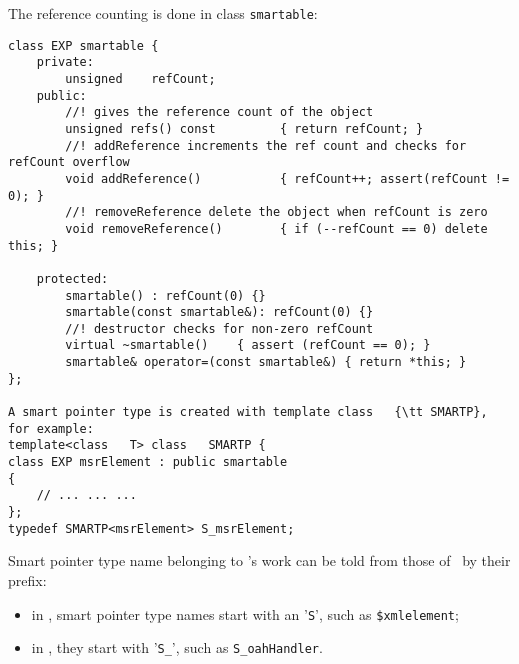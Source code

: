 The reference counting is done in class   {\tt smartable}:
\begin{lstlisting}[language=CPlusPlus]
class EXP smartable {
	private:
		unsigned 	refCount;
	public:
		//! gives the reference count of the object
		unsigned refs() const         { return refCount; }
		//! addReference increments the ref count and checks for refCount overflow
		void addReference()           { refCount++; assert(refCount != 0); }
		//! removeReference delete the object when refCount is zero
		void removeReference()		  { if (--refCount == 0) delete this; }

	protected:
		smartable() : refCount(0) {}
		smartable(const smartable&): refCount(0) {}
		//! destructor checks for non-zero refCount
		virtual ~smartable()    { assert (refCount == 0); }
		smartable& operator=(const smartable&) { return *this; }
};

A smart pointer type is created with template class   {\tt SMARTP}, for example:
template<class   T> class   SMARTP {
class EXP msrElement : public smartable
{
	// ... ... ...
};
typedef SMARTP<msrElement> S_msrElement;

\end{lstlisting}

Smart pointer type name belonging to \fober's work can be told from those of \mf\ by their prefix:
\begin{itemize}
\item  in \libmusicxml, smart pointer type names start with an '{\tt S}', such as {\tt \$xmlelement};
\item in \mf, they start with '{\tt S_}', such as {\tt S_oahHandler}.
\end{itemize}

